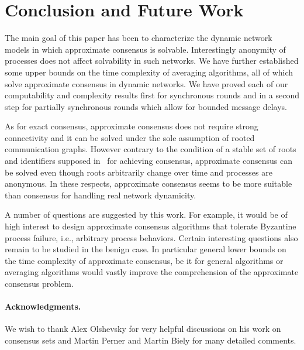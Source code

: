 \documentclass[a4paper]{article}
\theoremstyle{newthm}
\begin{document}
\section{Conclusion and Future Work}

The main goal of this paper has been to characterize the dynamic
     network models in which approximate consensus is solvable.
Interestingly anonymity of processes does not affect solvability in
     such networks.
We have further established some upper bounds on the time complexity
     of averaging algorithms, all of which solve approximate consensus
     in dynamic networks.
We have proved each of our computability and complexity results first
     for synchronous rounds and in a second step for partially
     synchronous rounds which allow for bounded message delays.

As for exact consensus, approximate consensus does not require strong
     connectivity and  it can be solved under the sole assumption of
     rooted communication graphs.
However contrary to the condition of a stable set of roots and
     identifiers supposed in~\cite{BRS12} for achieving consensus,
     approximate consensus can be solved even though roots arbitrarily
     change over time and processes are anonymous.
In these respects, approximate consensus seems to be more suitable than
     consensus for handling real network dynamicity.
	
A number of questions are suggested by this work.
For example, it would be of high interest to design approximate consensus algorithms
	that tolerate Byzantine process failure, i.e., arbitrary process behaviors.
Certain interesting questions also remain to be studied in the benign case.
In particular general lower bounds on the time complexity of approximate
consensus, be it for general algorithms or averaging algorithms would vastly
improve the comprehension of the approximate consensus problem.


\paragraph{Acknowledgments.} We wish to thank Alex Olshevsky for very helpful discussions on 
his work on consensus sets and Martin Perner and Martin Biely for many detailed comments.
\vspace{0.7cm}




\end{document}
